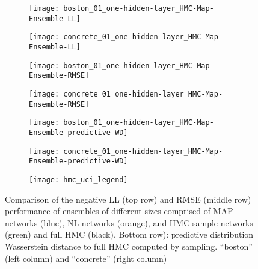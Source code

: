 \documentclass[../thesis.tex]{subfiles}
\begin{document}
\begin{figure}
    \centering
    \begin{subfigure}{0.49\textwidth}
        \texttt{[image: boston\_01\_one-hidden-layer\_HMC-Map-Ensemble-LL]} 
    \end{subfigure}
    \begin{subfigure}{0.49\textwidth}
        \texttt{[image: concrete\_01\_one-hidden-layer\_HMC-Map-Ensemble-LL]} 
    \end{subfigure}
    
    \begin{subfigure}{0.49\textwidth}
        \texttt{[image: boston\_01\_one-hidden-layer\_HMC-Map-Ensemble-RMSE]} 
    \end{subfigure}
    \begin{subfigure}{0.49\textwidth}
        \texttt{[image: concrete\_01\_one-hidden-layer\_HMC-Map-Ensemble-RMSE]} 
    \end{subfigure}
    
    \begin{subfigure}{0.49\textwidth}
        \texttt{[image: boston\_01\_one-hidden-layer\_HMC-Map-Ensemble-predictive-WD]} 
    \end{subfigure}
    \begin{subfigure}{0.49\textwidth}
        \texttt{[image: concrete\_01\_one-hidden-layer\_HMC-Map-Ensemble-predictive-WD]} 
    \end{subfigure}
    
    \begin{subfigure}{\textwidth}
        \centering
        \texttt{[image: hmc\_uci\_legend]} 
    \end{subfigure}
    
    \caption{Comparison of the negative LL (top row) and RMSE (middle row) performance of ensembles of different sizes comprised of MAP networks (blue), NL networks (orange), and HMC sample-networks (green) and full HMC (black). Bottom row): predictive distribution Wasserstein distance to full HMC computed by sampling. ``boston'' (left column) and ``concrete'' (right column)}
    \label{fig:boston_concrete_hmc_comparison}
\end{figure}
\end{document}
